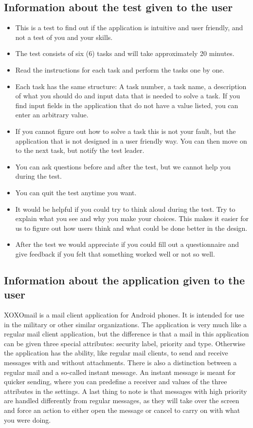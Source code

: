 		\subsection{Information about the test given to the user}
			\begin{itemize}
				\item{}This is a test to find out if the application is intuitive and user friendly, and not a test of you and your skills.
				\item{}The test consists of six (6) tasks and will take approximately 20 minutes.
				\item{}Read the instructions for each task and perform the tasks one by one.
				\item{}Each task has the same structure: A task number, a task name, a description of what you should do and input data that is needed to solve a task. If you find input fields in the application that do not have a value listed, you can enter an arbitrary value.
				\item{}If you cannot figure out how to solve a task this is not your fault, but the application that is not designed in a user friendly way. You can then move on to the next task, but notify the test leader.
				\item{}You can ask questions before and after the test, but we cannot help you during the test.
				\item{}You can quit the test anytime you want.
				\item{}It would be helpful if you could try to think aloud during the test. Try to explain what you see and why you make your choices. This makes it easier for us to figure out how users think and what could be done better in the design.
				\item{}After the test we would appreciate if you could fill out a questionnaire and give feedback if you felt that something worked well or not so well.
			\end{itemize}
\subsection{Information about the application given to the user}
			XOXOmail is a mail client application for Android phones. It is intended for use in the military or other similar organizations. The application is very much like a regular mail client application, but the difference is that a mail in this application can be given three special  attributes: security label, priority and type. Otherwise the application has the ability, like regular mail clients, to send and receive messages with and without attachments. 
			\newline
			\newline
			There is also a distinction between a regular mail and a so-called instant message. An instant message is meant for quicker sending, where you can predefine a receiver and values of the three attributes in the settings.  A last thing to note is that messages with high priority are handled differently from regular messages, as they will take over the screen and force an action to either open the message or cancel to carry on with what you were doing.
